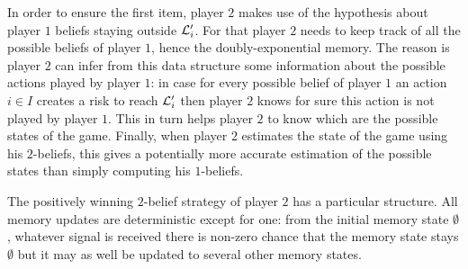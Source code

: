 {In order to ensure the first item, player $2$ makes use of the hypothesis
about player $1$ beliefs staying outside $\mathcal{L}_i'$. For that player $2$ needs to keep track of all the possible beliefs of player $1$, hence the doubly-exponential memory.
The reason is player $2$ can infer
from this data structure some information about the possible actions played by player $1$: in case
for every possible belief of player $1$ an action $i\in I$ creates a risk to reach $\mathcal{L}'_i$
then player $2$ knows for sure this action is not played by player $1$.
This in turn helps player $2$ to know which are the possible states of the game.
Finally, when player $2$ estimates the state of the game using his $2$-beliefs,
this gives a potentially more accurate estimation of the possible states than simply computing his $1$-beliefs.}

{The positively winning $2$-belief strategy of player $2$ has a particular structure.
All memory updates are deterministic except for one: from
the initial memory state $\emptyset$,
whatever signal is received there is non-zero chance that the memory state stays $\emptyset$ but it may as well 
be updated to several other memory states.}
\smallskip
